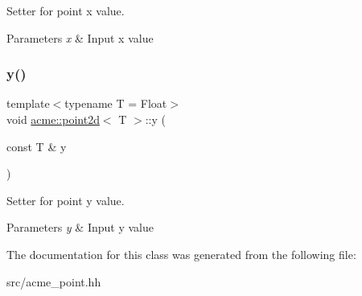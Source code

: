 Setter for point x value. 


\begin{DoxyParams}{Parameters}
{\em x} & Input x value \\
\hline
\end{DoxyParams}
\mbox{\label{classacme_1_1point2d_ab1baab0e82e178f1e828a25fa8dbb1c8}} 
\subsubsection{\texorpdfstring{y()}{y()}}
{\footnotesize\ttfamily template$<$typename T = Float$>$ \\
void \hyperlink{classacme_1_1point2d}{acme\+::point2d}$<$ T $>$\+::y (\begin{DoxyParamCaption}\item[{const T \&}]{y }\end{DoxyParamCaption})\hspace{0.3cm}{\ttfamily [inline]}}



Setter for point y value. 


\begin{DoxyParams}{Parameters}
{\em y} & Input y value \\
\hline
\end{DoxyParams}


The documentation for this class was generated from the following file\+:\begin{DoxyCompactItemize}
\item 
src/acme\+\_\+point.\+hh\end{DoxyCompactItemize}

